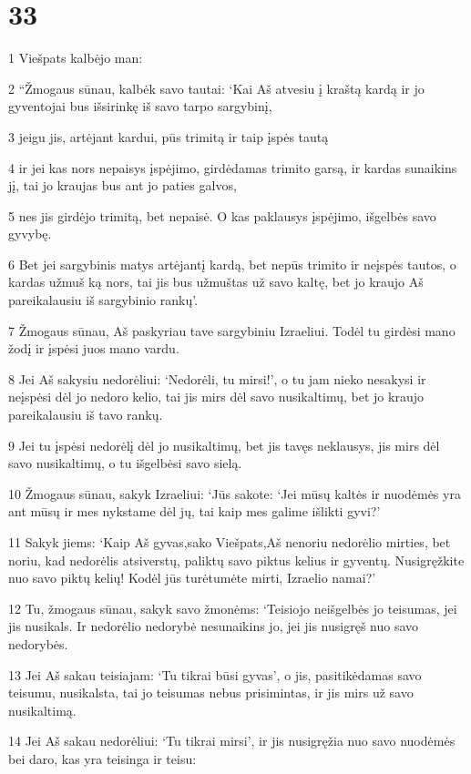 \chapter{33}


\par 1 Viešpats kalbėjo man: 
\par 2 “Žmogaus sūnau, kalbėk savo tautai: ‘Kai Aš atvesiu į kraštą kardą ir jo gyventojai bus išsirinkę iš savo tarpo sargybinį, 
\par 3 jeigu jis, artėjant kardui, pūs trimitą ir taip įspės tautą 
\par 4 ir jei kas nors nepaisys įspėjimo, girdėdamas trimito garsą, ir kardas sunaikins jį, tai jo kraujas bus ant jo paties galvos, 
\par 5 nes jis girdėjo trimitą, bet nepaisė. O kas paklausys įspėjimo, išgelbės savo gyvybę. 
\par 6 Bet jei sargybinis matys artėjantį kardą, bet nepūs trimito ir neįspės tautos, o kardas užmuš ką nors, tai jis bus užmuštas už savo kaltę, bet jo kraujo Aš pareikalausiu iš sargybinio rankų’. 
\par 7 Žmogaus sūnau, Aš paskyriau tave sargybiniu Izraeliui. Todėl tu girdėsi mano žodį ir įspėsi juos mano vardu. 
\par 8 Jei Aš sakysiu nedorėliui: ‘Nedorėli, tu mirsi!’, o tu jam nieko nesakysi ir neįspėsi dėl jo nedoro kelio, tai jis mirs dėl savo nusikaltimų, bet jo kraujo pareikalausiu iš tavo rankų. 
\par 9 Jei tu įspėsi nedorėlį dėl jo nusikaltimų, bet jis tavęs neklausys, jis mirs dėl savo nusikaltimų, o tu išgelbėsi savo sielą. 
\par 10 Žmogaus sūnau, sakyk Izraeliui: ‘Jūs sakote: ‘Jei mūsų kaltės ir nuodėmės yra ant mūsų ir mes nykstame dėl jų, tai kaip mes galime išlikti gyvi?’ 
\par 11 Sakyk jiems: ‘Kaip Aš gyvas,­sako Viešpats,­Aš nenoriu nedorėlio mirties, bet noriu, kad nedorėlis atsiverstų, paliktų savo piktus kelius ir gyventų. Nusigręžkite nuo savo piktų kelių! Kodėl jūs turėtumėte mirti, Izraelio namai?’ 
\par 12 Tu, žmogaus sūnau, sakyk savo žmonėms: ‘Teisiojo neišgelbės jo teisumas, jei jis nusikals. Ir nedorėlio nedorybė nesunaikins jo, jei jis nusigręš nuo savo nedorybės. 
\par 13 Jei Aš sakau teisiajam: ‘Tu tikrai būsi gyvas’, o jis, pasitikėdamas savo teisumu, nusikalsta, tai jo teisumas nebus prisimintas, ir jis mirs už savo nusikaltimą. 
\par 14 Jei Aš sakau nedorėliui: ‘Tu tikrai mirsi’, ir jis nusigręžia nuo savo nuodėmės bei daro, kas yra teisinga ir teisu: 
